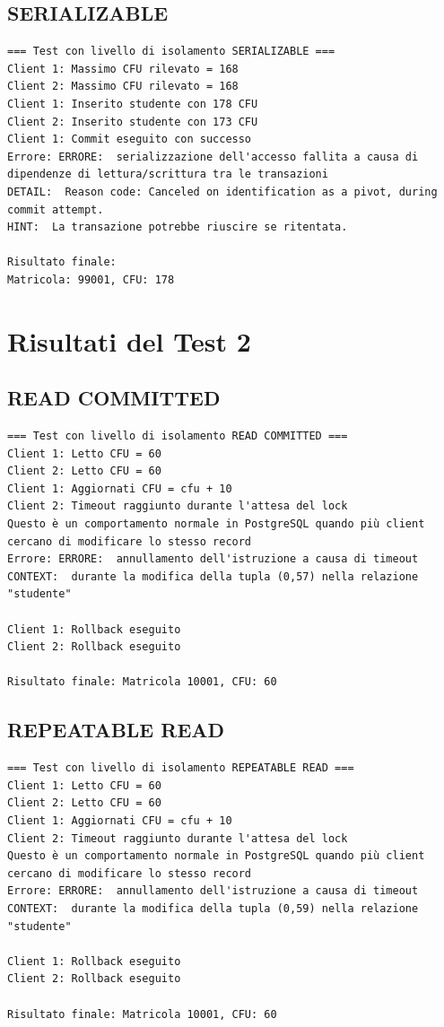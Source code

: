 \documentclass[a4paper,12pt]{report}
\begin{document}
\subsection{SERIALIZABLE}
\begin{verbatim}
=== Test con livello di isolamento SERIALIZABLE ===
Client 1: Massimo CFU rilevato = 168
Client 2: Massimo CFU rilevato = 168
Client 1: Inserito studente con 178 CFU
Client 2: Inserito studente con 173 CFU
Client 1: Commit eseguito con successo
Errore: ERRORE:  serializzazione dell'accesso fallita a causa di dipendenze di lettura/scrittura tra le transazioni
DETAIL:  Reason code: Canceled on identification as a pivot, during commit attempt.
HINT:  La transazione potrebbe riuscire se ritentata.

Risultato finale:
Matricola: 99001, CFU: 178
\end{verbatim}

\section{Risultati del Test 2}

\subsection{READ COMMITTED}
\begin{verbatim}
=== Test con livello di isolamento READ COMMITTED ===
Client 1: Letto CFU = 60
Client 2: Letto CFU = 60
Client 1: Aggiornati CFU = cfu + 10
Client 2: Timeout raggiunto durante l'attesa del lock
Questo è un comportamento normale in PostgreSQL quando più client cercano di modificare lo stesso record
Errore: ERRORE:  annullamento dell'istruzione a causa di timeout
CONTEXT:  durante la modifica della tupla (0,57) nella relazione "studente"

Client 1: Rollback eseguito
Client 2: Rollback eseguito

Risultato finale: Matricola 10001, CFU: 60
\end{verbatim}

\subsection{REPEATABLE READ}
\begin{verbatim}
=== Test con livello di isolamento REPEATABLE READ ===
Client 1: Letto CFU = 60
Client 2: Letto CFU = 60
Client 1: Aggiornati CFU = cfu + 10
Client 2: Timeout raggiunto durante l'attesa del lock
Questo è un comportamento normale in PostgreSQL quando più client cercano di modificare lo stesso record
Errore: ERRORE:  annullamento dell'istruzione a causa di timeout
CONTEXT:  durante la modifica della tupla (0,59) nella relazione "studente"

Client 1: Rollback eseguito
Client 2: Rollback eseguito

Risultato finale: Matricola 10001, CFU: 60
\end{verbatim}
\end{document}
